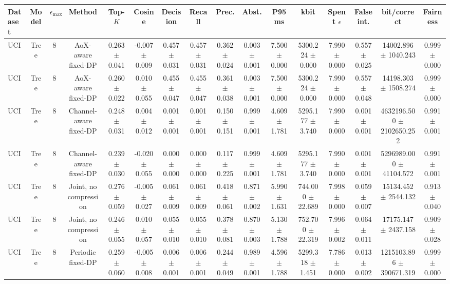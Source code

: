 \begin{tabular}{lccccccccccccccc}
\toprule
Dataset & Model & $\epsilon_{\max}$ & Method & Top-$K$ & Cosine & Decision & Recall & Prec. & Abst. & P95 ms & kbit & Spent $\epsilon$ & False int. & bit/correct & Fairness \\
\midrule
UCI & Tree & 8 & AoX-aware fixed-DP & 0.263 $\pm$ 0.041 & -0.007 $\pm$ 0.009 & 0.457 $\pm$ 0.031 & 0.457 $\pm$ 0.031 & 0.362 $\pm$ 0.024 & 0.003 $\pm$ 0.001 & 7.500 $\pm$ 0.000 & 5300.224 $\pm$ 0.000 & 7.990 $\pm$ 0.000 & 0.557 $\pm$ 0.025 & 14002.896 $\pm$ 1040.243 & 0.999 $\pm$ 0.000 \\
UCI & Tree & 8 & AoX-aware fixed-DP & 0.260 $\pm$ 0.022 & 0.010 $\pm$ 0.055 & 0.455 $\pm$ 0.047 & 0.455 $\pm$ 0.047 & 0.361 $\pm$ 0.038 & 0.003 $\pm$ 0.001 & 7.500 $\pm$ 0.000 & 5300.224 $\pm$ 0.000 & 7.990 $\pm$ 0.000 & 0.557 $\pm$ 0.048 & 14198.303 $\pm$ 1508.274 & 0.999 $\pm$ 0.000 \\
UCI & Tree & 8 & Channel-aware fixed-DP & 0.248 $\pm$ 0.031 & 0.004 $\pm$ 0.012 & 0.001 $\pm$ 0.001 & 0.001 $\pm$ 0.001 & 0.150 $\pm$ 0.151 & 0.999 $\pm$ 0.001 & 4.609 $\pm$ 1.781 & 5295.177 $\pm$ 3.740 & 7.990 $\pm$ 0.000 & 0.001 $\pm$ 0.001 & 4632196.500 $\pm$ 2102650.252 & 0.991 $\pm$ 0.001 \\
UCI & Tree & 8 & Channel-aware fixed-DP & 0.239 $\pm$ 0.030 & -0.020 $\pm$ 0.055 & 0.000 $\pm$ 0.000 & 0.000 $\pm$ 0.000 & 0.117 $\pm$ 0.225 & 0.999 $\pm$ 0.001 & 4.609 $\pm$ 1.781 & 5295.177 $\pm$ 3.740 & 7.990 $\pm$ 0.000 & 0.001 $\pm$ 0.001 & 5296989.000 $\pm$ 41104.572 & 0.991 $\pm$ 0.001 \\
UCI & Tree & 8 & Joint, no compression & 0.276 $\pm$ 0.059 & -0.005 $\pm$ 0.027 & 0.061 $\pm$ 0.009 & 0.061 $\pm$ 0.009 & 0.418 $\pm$ 0.061 & 0.871 $\pm$ 0.002 & 5.990 $\pm$ 1.631 & 744.000 $\pm$ 22.689 & 7.998 $\pm$ 0.000 & 0.059 $\pm$ 0.007 & 15134.452 $\pm$ 2544.132 & 0.913 $\pm$ 0.040 \\
UCI & Tree & 8 & Joint, no compression & 0.246 $\pm$ 0.055 & 0.010 $\pm$ 0.057 & 0.055 $\pm$ 0.010 & 0.055 $\pm$ 0.010 & 0.378 $\pm$ 0.081 & 0.870 $\pm$ 0.003 & 5.130 $\pm$ 1.788 & 752.700 $\pm$ 22.319 & 7.996 $\pm$ 0.002 & 0.064 $\pm$ 0.011 & 17175.147 $\pm$ 2437.158 & 0.909 $\pm$ 0.028 \\
UCI & Tree & 8 & Periodic fixed-DP & 0.259 $\pm$ 0.060 & -0.005 $\pm$ 0.008 & 0.006 $\pm$ 0.001 & 0.006 $\pm$ 0.001 & 0.244 $\pm$ 0.049 & 0.989 $\pm$ 0.001 & 4.596 $\pm$ 1.788 & 5299.318 $\pm$ 1.451 & 7.786 $\pm$ 0.000 & 0.013 $\pm$ 0.002 & 1215103.896 $\pm$ 390671.319 & 0.999 $\pm$ 0.000 \\

\end{tabular}
